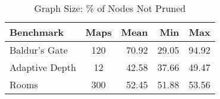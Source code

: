 \begin{table}[ht]
\caption{Graph Size: \% of Nodes Not Pruned}
  \label{table-graphsize}
\begin{center}
\begin{tabular}{lcrrr}
  \hline
 Benchmark & Maps & Mean  & Min  & Max  \\ 
  \hline
Baldur's Gate & 120 & 70.92 & 29.05 & 94.92 \\ 
Adaptive Depth & 12 & 42.58 & 37.66 & 49.47 \\ 
Rooms  & 300 & 52.45 & 51.88 & 53.56 \\ 
   \hline
\end{tabular}
\end{center}
\end{table}

